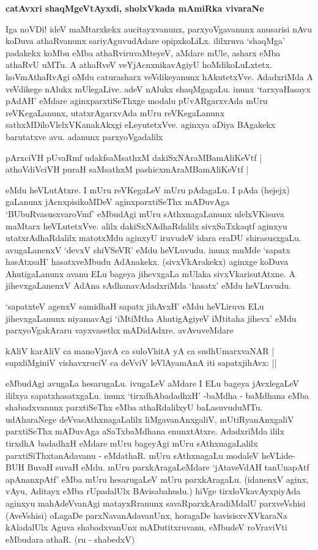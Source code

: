 {\bigskip
\noindent
{\large\bf catAvxri shaqMgeVtAyxdi, sholxVkada mAmiRka vivaraNe}}\label{page209}
\medskip

\noindent
Iga noVDi! ideV maMtarxkekx aucitayxvanunx, parxyoVgavanunx anusarisi nAvu koDuva athaRvanunx sariyAguvudAdare opipxkoLiLx. ililxruva `shaqMga' padakekx koMbu eMba athaRviruvaMteyeV, aMdare mUle, asharx eMba athaRvU uMTu. A athaRveV veYjAcnxnikavAgiyU hoMdikoLuLxtetx. hoVmAthaR\-vAgi oMdu caturasharx veVdikeyanunx hAkutetxVve. AdadxriMda A veVdikege nAlukx mUlegaLive. adeV nAlukx shaqMgagaLu. inunx `tarxyaHasayx pAdAH' eMdare aginxparxtiSeThxge modalu pUvARgarxvAda mUru reVKegaLanunx, utatxrAgarxvAda mUru reVKegaLanunx sathxMDiloVlelxVKanakAkxgi eLeyutetxVve. aginxya aDiya BAgakekx barutatxve avu. adanunx parxyoVgadalilx

\smallskip
\begin{shloka}
pArxciVH pUvaRmf udakfsaMsathxM dakiSxNAraMBamAliKeVtf |\\\label{210}
athoVdiVciVH puraH saMsathxM pashicxmAraMBamAliKeVtf |
\end{shloka}
\smallskip

\noindent
eMdu heVLutAtxre. I mUru reVKegaLeV mUru pAdagaLu. I pAda (hejejx) gaLanunx jAcnxpisi\-koMDeV aginxparxtiSeThx mADuvAga `BUbuRvasusxvaroVmf' eMbudAgi mUru sAthxnagaLanunx ulelxVKi\-suva maMtarx heVLutetxVve. alilx dakiSxNAdhaRdalilx sivxSaTxkaqtf aginxyu utatxrAdhaRdalilx matotxMdu aginxyU iruvudeV idara eraDU shirasusxgaLu. avugaLanenxV `devxV shiVSeVR' eMdu heVLuvudu. inunx muMde `sapatx hasAtxsaH' hasatxveMbudu AdAnakekx. (sivxVkArakekx) aginxge koDuva AhutigaLanunx avanu ELu bageya jihevxgaLa mUlaka sivxVkarisutAtxne. A jihevxgaLanenxV AdAna sAdhanavAdadxriMda `hasatx' eMdu heVLuvudu.

`sapatxteV agenxV samidhaH sapatx jihAvxH'\label{210} eMdu heVLiruva ELu jihevxgaLanunx niyamavAgi `iMtiMtha AhutigAgiyeV iMtitaha jihevx' eMdu parxyoVgakAraru vayxvasethx mADidAdxre. avAvuveMdare

\begin{shloka}
kAliV karAliV ca manoVjavA ca suloVhitA yA ca sudhUmarxvaNAR |\\\label{210}
supxliMginiV vishavxruciV ca deVviV leVlAyamAnA iti sapatxjihAvx: ||
\end{shloka}

\noindent
eMbudAgi avugaLa hesarugaLu. ivugaLeV aMdare I ELu bageya jAvxlegaLeV ililxya sapatx\-hasatxgaLu. inunx `tirxdhAbadadhxH' -baMdha - baMdhana eMba shabadxvanunx parxtiSeThx eMba athaRdalilxyU baLa\-suvuduMTu. udAharaNege deVvasAthxnagaLalilx liMgavanAnxgaliV, mUtiRyanAnxgaliV parxtiSeThx mADu\-vAga aSaTxbaMdhana enunxtAtxre. AdadxriMda ililx tirxdhA badadhxH eMdare mUru bageyAgi mUru sAthxnagaLalilx parxti\-SiThxtanAdavanu - eMdathaR. mUru sAthxnagaLu modaleV heVLide- BUH BuvaH suvaH eMdu. mUru parxkAragaLeMdare `jAtaveVdAH tanUnapAtf apAnanxpAtf' eMba mUru hesarugaLeV mUru parxkAra\-gaLu. (idanenxV aginx, vAyu, Aditayx eMba rUpadalUlx BAvisabahudu.) hiVge tirxloVkavAyxpi\-yAda aginxyu mahAdeVvanAgi matayxRranunx savaRparxkAradiMdalU parxveVshisi (AveVshisi) oLagaDe parxNavanAda\-vanUnx, horagaDe havisisxvXVkaraNa kAladalUlx Aguva shabadxvanUnx mADutitxruvanu, eMbudeV roVra\-viVti eMbudara athaR. (ru - shabedxV)

